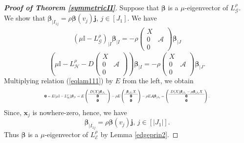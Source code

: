\documentclass{amsart}
\theoremstyle{remark}
\begin{document}
\begin{proof}[\textbf{Proof of Theorem \ref{symmetricII}}]
Suppose that $\pmb{\beta}$ is a $\mu$-eigenvector of $L_{\mathcal{G}}^{\rho}$. We show that $\pmb{\beta}_{|I_{1j}}=\rho\pmb{\beta}(v_{j})\pmb{j}$, $j\in [J_{1}]$. We have
{\footnotesize \begin{align*}
(\mu\mathbb{I}-{L_{\mathcal{G}}^{\rho}})_{|I}\pmb{\beta}_{| I}=-
\rho \left(\begin{array}{c|c}
 X &   \\
 0 &\mathcal{A}\\
 0 &
\end{array}\right)
\pmb{\beta}_{| J}
\end{align*}
\begin{equation}\label{eqlam111}
(\mu\mathbb{I}-L_{\mathcal{H}}^{\rho}-D\left(\begin{array}{c|c}
 X  &   \\
 0 &\mathcal{A}\\
 0 &
\end{array}\right))\pmb{\beta}_{| I}=-
\rho \left(\begin{array}{c|c}
 X  &   \\
 0 &\mathcal{A}\\
 0 &
\end{array}\right)
\pmb{\beta}_{| J}.
\end{equation}}
Multiplying relation (\ref{eqlam111}) by $E$ from the left, we obtain
\begin{equation*}
\resizebox{ 0.7\textwidth}{!} 
{$
\pmb{0}=E(\mu\mathbb{I}-L_{\mathcal{H}}^{\rho})\pmb{\beta}_{| I}=
E\left(
\begin{array}{c}
    D(X)\pmb{\beta}_{| I_{1}}  \\ \cline{1-1}
    \pmb{0}   \\
   \pmb{0}
 \end{array}\right)-
\rho E\left(
\begin{array}{c}
  \pmb{\beta}_{|J_{1}}  X\\\cline{1-1}
   \pmb{0}\\
   \pmb{0}
\end{array}\right)-
\rho E\mathcal{A}\pmb{\beta}_{| J_{2}}=
\left(
\begin{array}{c}
    D(X)\pmb{\beta}_{| I_{1}}-\rho  \pmb{\beta}_{|J_{1}}  X  \\ \cline{1-1}
    \pmb{0}   \\
   \pmb{0}
 \end{array}\right).$}
\end{equation*}
Since, $\pmb{x}_j$ is nowhere-zero, hence, we have 
\begin{equation}\label{rel}
\pmb{\beta}_{| I_{1j}}=\rho \pmb{\beta}(v_{j})\pmb{j},\, j\in [|J_{1}|].
\end{equation}
Thus $\pmb{\beta}$ is a $\mu$-eigenvector of $L_{\mathcal{E}}^{\rho}$ by  Lemma \ref{edgeprin2}.


\end{proof}
\end{document}
